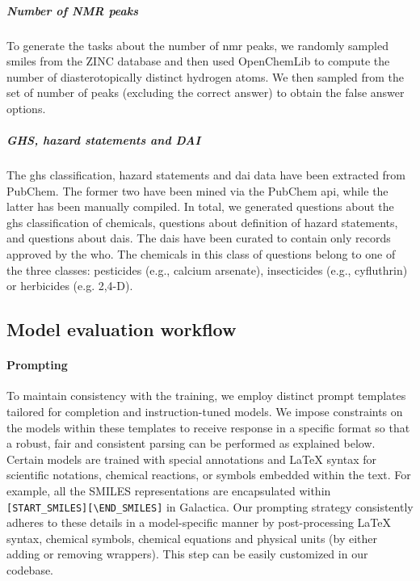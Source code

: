 \documentclass[11pt, oneside]{article}
\begin{document}
\begin{refsection}
\subparagraph{Number of NMR peaks} 
To generate the   tasks about the number of \gls{nmr} peaks, we randomly sampled \gls{smiles} from the ZINC database\autocite{Irwin_2012} and then used OpenChemLib\autocite{openchemlib} to compute the number of diasterotopically distinct hydrogen atoms. 
We then sampled from the set of number of peaks (excluding the correct answer) to obtain the false answer options.

\subparagraph{GHS, hazard statements and DAI}
The \gls{ghs} classification, hazard statements and \gls{dai} data have been extracted from PubChem.\autocite{pubchem}
The former two have been mined via the PubChem \gls{api}, while the latter has been manually compiled. 
In total, we generated  questions about the \gls{ghs} classification of chemicals,  questions about definition of hazard statements, and  questions about \glspl{dai}.
The \glspl{dai} have been curated to contain only records approved by the \gls{who}.
The chemicals in this class of questions belong to one of the three classes: pesticides (e.g., calcium arsenate), insecticides (e.g., cyfluthrin) or herbicides (e.g. 2,4-D).


\subsection{Model evaluation workflow}

\paragraph{Prompting}

To maintain consistency with the training, we employ distinct prompt templates tailored for completion and instruction-tuned models. 
We impose constraints on the models within these templates to receive response in a specific format so that a robust, fair and consistent parsing can be performed as explained below.
Certain models are trained with special annotations and \LaTeX\xspace syntax for scientific notations, chemical reactions, or symbols embedded within the text. 
For example, all the SMILES representations are encapsulated within \texttt{[START\_SMILES][\textbackslash END\_SMILES]} in Galactica\autocite{taylor2022galactica}.
Our prompting strategy consistently adheres to  these details in a model-specific manner by post-processing \LaTeX\xspace syntax, chemical symbols, chemical equations and physical units (by either adding or removing wrappers).
This step can be easily customized in our codebase.




\end{refsection}
\end{document}
